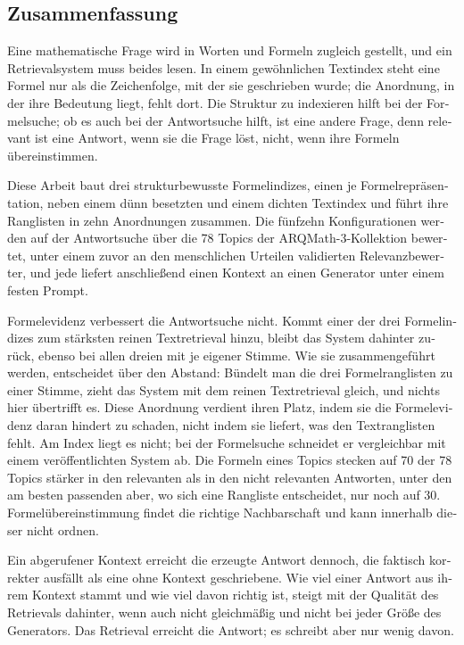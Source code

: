 \begin{otherlanguage}{ngerman}
\subsection*{Zusammenfassung}

Eine mathematische Frage wird in Worten und Formeln zugleich gestellt, und ein Retrievalsystem
muss beides lesen. In einem gewöhnlichen Textindex steht eine Formel nur als die Zeichenfolge,
mit der sie geschrieben wurde; die Anordnung, in der ihre Bedeutung liegt, fehlt dort. Die
Struktur zu indexieren hilft bei der Formelsuche; ob es auch bei der Antwortsuche hilft, ist eine
andere Frage, denn relevant ist eine Antwort, wenn sie die Frage löst, nicht, wenn ihre Formeln
übereinstimmen.

Diese Arbeit baut drei strukturbewusste Formelindizes, einen je Formelrepräsentation, neben einem
dünn besetzten und einem dichten Textindex und führt ihre Ranglisten in zehn Anordnungen
zusammen. Die fünfzehn Konfigurationen werden auf der Antwortsuche über die 78 Topics der
ARQMath-3-Kollektion bewertet, unter einem zuvor an den menschlichen Urteilen validierten
Relevanzbewerter, und jede liefert anschließend einen Kontext an einen Generator unter einem
festen Prompt.

Formelevidenz verbessert die Antwortsuche nicht. Kommt einer der drei Formelindizes zum stärksten
reinen Textretrieval hinzu, bleibt das System dahinter zurück, ebenso bei allen dreien mit je
eigener Stimme. Wie sie zusammengeführt werden, entscheidet über den Abstand: Bündelt man die
drei Formelranglisten zu einer Stimme, zieht das System mit dem reinen Textretrieval gleich, und
nichts hier übertrifft es. Diese Anordnung verdient ihren Platz, indem sie die Formelevidenz
daran hindert zu schaden, nicht indem sie liefert, was den Textranglisten fehlt. Am Index liegt
es nicht; bei der Formelsuche schneidet er vergleichbar mit einem veröffentlichten System ab. Die
Formeln eines Topics stecken auf 70 der 78 Topics stärker in den relevanten als in den nicht
relevanten Antworten, unter den am besten passenden aber, wo sich eine Rangliste entscheidet, nur
noch auf 30. Formelübereinstimmung findet die richtige Nachbarschaft und kann innerhalb dieser
nicht ordnen.

Ein abgerufener Kontext erreicht die erzeugte Antwort dennoch, die faktisch korrekter ausfällt
als eine ohne Kontext geschriebene. Wie viel einer Antwort aus ihrem Kontext stammt und wie viel
davon richtig ist, steigt mit der Qualität des Retrievals dahinter, wenn auch nicht gleichmäßig
und nicht bei jeder Größe des Generators. Das Retrieval erreicht die Antwort; es schreibt aber
nur wenig davon.
\end{otherlanguage}

